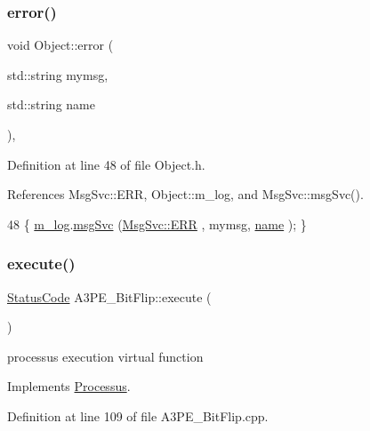 \subsubsection{\texorpdfstring{error()}{error()}\hspace{0.1cm}{\footnotesize\ttfamily [2/2]}}
{\footnotesize\ttfamily void Object\+::error (\begin{DoxyParamCaption}\item[{std\+::string}]{mymsg,  }\item[{std\+::string}]{name }\end{DoxyParamCaption})\hspace{0.3cm}{\ttfamily [inline]}, {\ttfamily [inherited]}}



Definition at line 48 of file Object.\+h.



References Msg\+Svc\+::\+E\+RR, Object\+::m\+\_\+log, and Msg\+Svc\+::msg\+Svc().


\begin{DoxyCode}
48 \{ \hyperlink{classObject_a0d269813dd7ac1f24bc143031e2963f2}{m\_log}.\hyperlink{classMsgSvc_ad25f18047920cc59a314e5098259711c}{msgSvc} (\hyperlink{classMsgSvc_ae671eb7301996cd049d2da8a65925926a35a9d7166e9896af4ec8fb33bf5f1772}{MsgSvc::ERR}     , mymsg, \hyperlink{classObject_a300f4c05dd468c7bb8b3c968868443c1}{name} ); \}
\end{DoxyCode}
\mbox{\label{classA3PE__BitFlip_affa7320fb39001a6e9b5696542fe4584}} 
\subsubsection{\texorpdfstring{execute()}{execute()}}
{\footnotesize\ttfamily \hyperlink{classStatusCode}{Status\+Code} A3\+P\+E\+\_\+\+Bit\+Flip\+::execute (\begin{DoxyParamCaption}{ }\end{DoxyParamCaption})\hspace{0.3cm}{\ttfamily [virtual]}}

processus execution virtual function 

Implements \hyperlink{classProcessus_a63767a63a1fb0055c5aa45b21a4a5d58}{Processus}.



Definition at line 109 of file A3\+P\+E\+\_\+\+Bit\+Flip.\+cpp.



